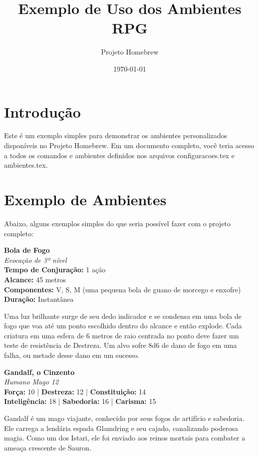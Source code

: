 \documentclass{article}
\begin{document}
\title{Exemplo de Uso dos Ambientes RPG}
\author{Projeto Homebrew}
\date{\today}

\maketitle

\section{Introdução}

Este é um exemplo simples para demonstrar os ambientes personalizados disponíveis no Projeto Homebrew. Em um documento completo, você teria acesso a todos os comandos e ambientes definidos nos arquivos configuracoes.tex e ambientes.tex.

\section{Exemplo de Ambientes}

Abaixo, alguns exemplos simples do que seria possível fazer com o projeto completo:

\begin{tcolorbox}[title=Feitiço]
\textbf{Bola de Fogo}\\
\textit{Evocação de 3º nível}\\
\textbf{Tempo de Conjuração:} 1 ação\\
\textbf{Alcance:} 45 metros\\
\textbf{Componentes:} V, S, M (uma pequena bola de guano de morcego e enxofre)\\
\textbf{Duração:} Instantânea

Uma luz brilhante surge de seu dedo indicador e se condensa em uma bola de fogo que voa até um ponto escolhido dentro do alcance e então explode. Cada criatura em uma esfera de 6 metros de raio centrada no ponto deve fazer um teste de resistência de Destreza. Um alvo sofre 8d6 de dano de fogo em uma falha, ou metade desse dano em um sucesso.
\end{tcolorbox}

\vspace{1cm}

\begin{tcolorbox}[title=Personagem]
\textbf{Gandalf, o Cinzento}\\
\textit{Humano Mago 12}\\
\textbf{Força:} 10 | \textbf{Destreza:} 12 | \textbf{Constituição:} 14\\
\textbf{Inteligência:} 18 | \textbf{Sabedoria:} 16 | \textbf{Carisma:} 15

Gandalf é um mago viajante, conhecido por seus fogos de artifício e sabedoria. Ele carrega a lendária espada Glamdring e seu cajado, canalizando poderosa magia. Como um dos Istari, ele foi enviado aos reinos mortais para combater a ameaça crescente de Sauron.
\end{tcolorbox}
\end{document}
